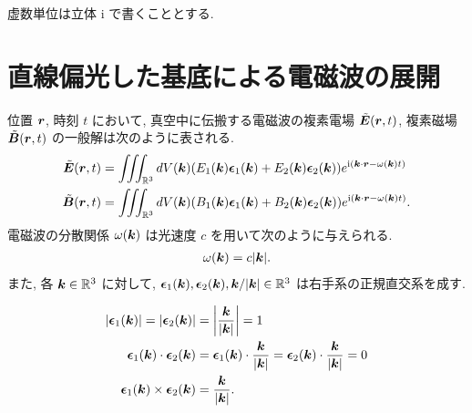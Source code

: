 \documentclass[uplatex,a4paper,dvipdfmx]{jsarticle}
\theoremstyle{definition}
\begin{document}
\title{}
\author{
  学籍番号:21B00349\\
  氏名:宇佐見　大希\\
}
\maketitle

\newcommand{\ZZ}{\mathbb{Z}}
\newcommand{\RR}{\mathbb{R}}
\newcommand{\CC}{\mathbb{C}}
\newcommand{\EE}{\vb*{E}}
\newcommand{\Et}{\tilde{E}}
\newcommand{\ET}{\tilde{\vb*{E}}}
\newcommand{\Ec}{\mathcal{E}}
\newcommand{\EC}{\vb*{\mathcal{E}}}
\newcommand{\BB}{\vb*{B}}
\newcommand{\LL}{\vb*{L}}
\renewcommand{\AA}{\vb*{A}}
\newcommand{\ee}{\vb*{\epsilon}}
\newcommand{\kk}{\vb*{k}}
\newcommand{\rr}{\vb*{r}}
\renewcommand{\SS}{\vb*{S}}
\newcommand{\JJ}{\vb*{J}}
\newcommand{\ii}{\mathrm{i}}

虚数単位は立体 $\ii$ で書くこととする.

\section{直線偏光した基底による電磁波の展開}

位置 $\rr$, 時刻 $t$ において, 真空中に伝搬する電磁波の複素電場 $\tilde{\EE}(\rr, t)$, 複素磁場 $\tilde{\BB}(\rr, t)$ の一般解は次のように表される.
\begin{align}
  \tilde{\EE}(\rr, t) & = \iiint_{\RR^3} dV(\kk)(E_1(\kk)\ee_1(\kk) + E_2(\kk)\ee_2(\kk))e^{\ii(\kk\cdot\rr - \omega(\kk)t)} \label{tilde E}  \\
  \tilde{\BB}(\rr, t) & = \iiint_{\RR^3} dV(\kk)(B_1(\kk)\ee_1(\kk) + B_2(\kk)\ee_2(\kk))e^{\ii(\kk\cdot\rr - \omega(\kk)t)}. \label{tilde B}
\end{align}
電磁波の分散関係 $\omega(\kk)$ は光速度 $c$ を用いて次のように与えられる.
\begin{align}
  \omega(\kk) = c\lvert\kk\rvert.
\end{align}
また, 各 $\kk\in\RR^3$ に対して, $\ee_1(\kk), \ee_2(\kk), \kk/\lvert\kk\rvert\in\RR^3$ は右手系の正規直交系を成す.

\begin{align}
  |\ee_1(\kk)| = |\ee_2(\kk)| & = \left|\frac{\kk}{|\kk|}\right| = 1                                      \\
  \ee_1(\kk)\cdot\ee_2(\kk)   & = \ee_1(\kk)\cdot\frac{\kk}{|\kk|} = \ee_2(\kk)\cdot\frac{\kk}{|\kk|} = 0 \\
  \ee_1(\kk)\times\ee_2(\kk)  & = \frac{\kk}{|\kk|}.
\end{align}
\end{document}
